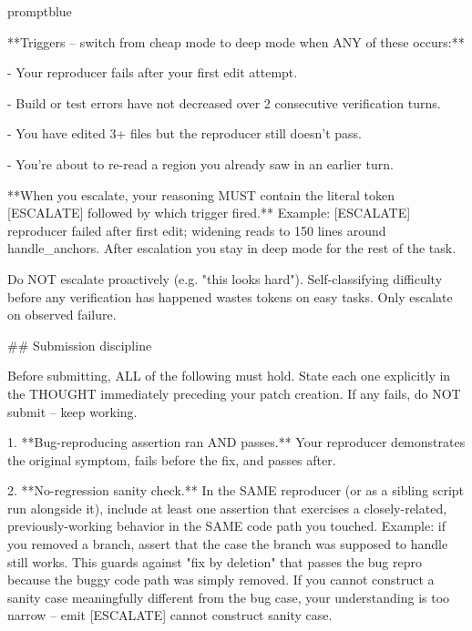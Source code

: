 \begin{promptbox}{promptblue}
{**Triggers -- switch from cheap mode to deep mode when ANY of these occurs:**\par
- Your reproducer fails after your first edit attempt.\par
- Build or test errors have not decreased over 2 consecutive verification turns.\par
- You have edited 3+ files but the reproducer still doesn't pass.\par
- You're about to re-read a region you already saw in an earlier turn.\par
\vspace{0.35em}\par
**When you escalate, your reasoning MUST contain the literal token \textasciigrave{}[ESCALATE]\textasciigrave{} followed by which trigger fired.** Example: \textasciigrave{}[ESCALATE] reproducer failed after first edit; widening reads to 150 lines around handle\_anchors\textasciigrave{}. After escalation you stay in deep mode for the rest of the task.\par
\vspace{0.35em}\par
Do NOT escalate proactively (e.g. "this looks hard"). Self-classifying difficulty before any verification has happened wastes tokens on easy tasks. Only escalate on observed failure.\par
\vspace{0.35em}\par
\#\# Submission discipline\par
\vspace{0.35em}\par
Before submitting, ALL of the following must hold. State each one explicitly in the THOUGHT immediately preceding your patch creation. If any fails, do NOT submit -- keep working.\par
\vspace{0.35em}\par
1. **Bug-reproducing assertion ran AND passes.** Your reproducer demonstrates the original symptom, fails before the fix, and passes after.\par
2. **No-regression sanity check.** In the SAME reproducer (or as a sibling script run alongside it), include at least one assertion that exercises a closely-related, previously-working behavior in the SAME code path you touched. Example: if you removed a branch, assert that the case the branch was supposed to handle still works. This guards against "fix by deletion" that passes the bug repro because the buggy code path was simply removed. If you cannot construct a sanity case meaningfully different from the bug case, your understanding is too narrow -- emit \textasciigrave{}[ESCALATE] cannot construct sanity case\textasciigrave{}.\par
}
\end{promptbox}
